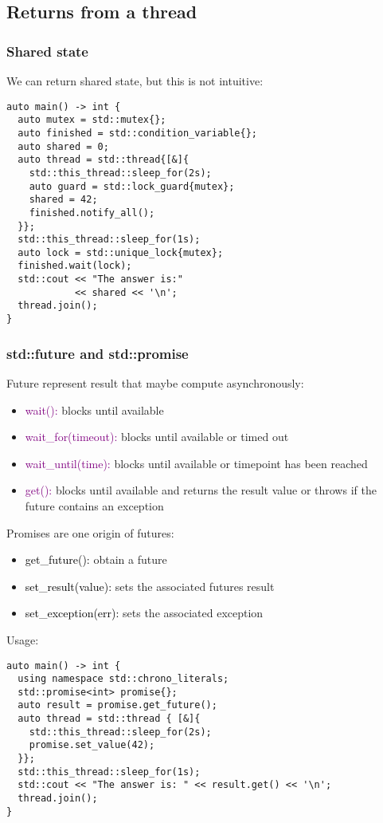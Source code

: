\documentclass[main.tex,fontsize=8pt,paper=a4,paper=portrait,DIV=calc,]{scrartcl}
\begin{document}
\subsection{Returns from a thread}
\subsubsection{Shared state}
We can return shared state, but this is not intuitive:
\begin{lstlisting}
auto main() -> int {
  auto mutex = std::mutex{};
  auto finished = std::condition_variable{};
  auto shared = 0;
  auto thread = std::thread{[&]{
    std::this_thread::sleep_for(2s);
    auto guard = std::lock_guard{mutex};
    shared = 42;
    finished.notify_all();
  }};
  std::this_thread::sleep_for(1s);
  auto lock = std::unique_lock{mutex};
  finished.wait(lock);
  std::cout << "The answer is:"
            << shared << '\n';
  thread.join();
}
\end{lstlisting}

\subsubsection{std::future and std::promise}
Future represent result that maybe compute asynchronously:
\begin{itemize}
\item \textcolor{purple}{wait():} blocks until available
\item \textcolor{purple}{wait\_for(timeout):} blocks until available or timed out
\item \textcolor{purple}{wait\_until(time):} blocks until available or timepoint has been reached
\item \textcolor{purple}{get():} blocks until available and returns the result value or throws if the future contains an exception
\end{itemize} 
Promises are one origin of futures:
\begin{itemize}
\item \textcolor{black}{get\_future():} obtain a future
\item \textcolor{black}{set\_result(value):} sets the associated futures result
\item \textcolor{black}{set\_exception(err):} sets the associated exception
\end{itemize} 
Usage:
\begin{lstlisting}
auto main() -> int {
  using namespace std::chrono_literals;
  std::promise<int> promise{};
  auto result = promise.get_future();
  auto thread = std::thread { [&]{
    std::this_thread::sleep_for(2s);
    promise.set_value(42);
  }};
  std::this_thread::sleep_for(1s);
  std::cout << "The answer is: " << result.get() << '\n';
  thread.join();
}
\end{lstlisting}
\end{document}
